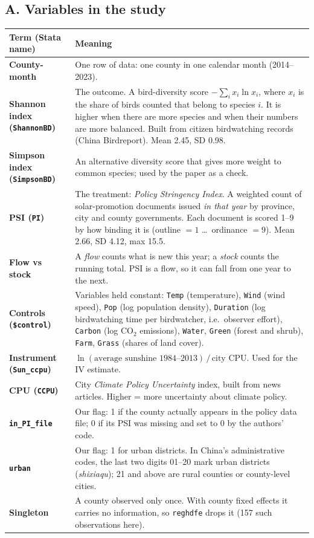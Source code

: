 \documentclass[11pt]{article}
\begin{document}
\subsection*{A. Variables in the study}
\begin{table}[H]\centering\small
\begin{tabularx}{\linewidth}{>{\bfseries}l>{\raggedright\arraybackslash}X}
\toprule
Term (Stata name) & Meaning\\
\midrule
County-month & One row of data: one county in one calendar month (2014--2023).\\
Shannon index (\texttt{ShannonBD}) & The outcome. A bird-diversity score $-\sum_i x_i\ln x_i$, where $x_i$ is the share of birds counted that belong to species $i$. It is higher when there are more species and when their numbers are more balanced. Built from citizen birdwatching records (China Birdreport). Mean 2.45, SD 0.98.\\
Simpson index (\texttt{SimpsonBD}) & An alternative diversity score that gives more weight to common species; used by the paper as a check.\\
PSI (\texttt{PI}) & The treatment: \emph{Policy Stringency Index}. A weighted count of solar-promotion documents issued \emph{in that year} by province, city and county governments. Each document is scored 1--9 by how binding it is (outline $=1$ \dots\ ordinance $=9$). Mean 2.66, SD 4.12, max 15.5.\\
Flow vs stock & A \emph{flow} counts what is new this year; a \emph{stock} counts the running total. PSI is a flow, so it can fall from one year to the next.\\
Controls (\texttt{\$control}) & Variables held constant: \texttt{Temp} (temperature), \texttt{Wind} (wind speed), \texttt{Pop} (log population density), \texttt{Duration} (log birdwatching time per birdwatcher, i.e.\ observer effort), \texttt{Carbon} (log CO$_2$ emissions), \texttt{Water}, \texttt{Green} (forest and shrub), \texttt{Farm}, \texttt{Grass} (shares of land cover).\\
Instrument (\texttt{Sun\_ccpu}) & $\ln(\text{average sunshine 1984--2013})\,/\,\text{city CPU}$. Used for the IV estimate.\\
CPU (\texttt{CCPU}) & City \emph{Climate Policy Uncertainty} index, built from news articles. Higher = more uncertainty about climate policy.\\
\texttt{in\_PI\_file} & Our flag: 1 if the county actually appears in the policy data file; 0 if its PSI was missing and set to 0 by the authors' code.\\
\texttt{urban} & Our flag: 1 for urban districts. In China's administrative codes, the last two digits 01--20 mark urban districts (\textit{shixiaqu}); 21 and above are rural counties or county-level cities.\\
Singleton & A county observed only once. With county fixed effects it carries no information, so \texttt{reghdfe} drops it (157 such observations here).\\
\bottomrule
\end{tabularx}
\end{table}
\end{document}
